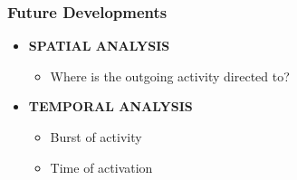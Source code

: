 \documentclass{beamer}
\begin{document}

\begin{frame}
\frametitle{Future Developments}

\begin{itemize}
	\Large
	\item \large\textbf{SPATIAL ANALYSIS}
	\vspace{0.2cm}
	\begin{itemize}
	\item \large Where is the outgoing activity directed to?
	\end{itemize}
	\vspace{0.5cm}

	\item \large\textbf{TEMPORAL ANALYSIS}
	\vspace{0.2cm}
	\begin{itemize}
		\item Burst of activity
		\item Time of activation
	\end{itemize}
\end{itemize}
\end{frame}

\end{document}

